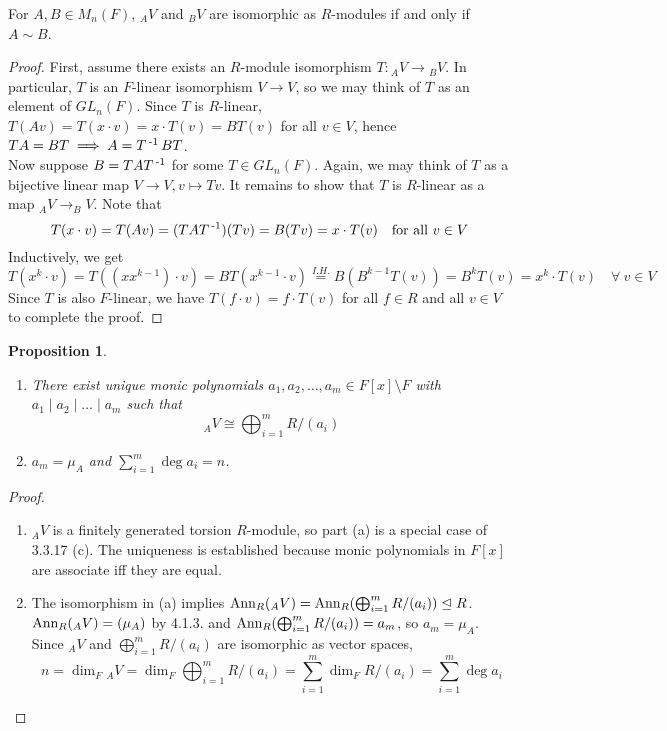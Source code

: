 \documentclass[11pt]{book}
\newcounter{counter}
\newtheorem{proposition}[counter]{Proposition}   \newtheorem{problem}[counter]{Problem}   \newtheorem*{proposition*}{Proposition}   \newtheorem*{lemma*}{Lemma}
\theoremstyle{definition}   \newtheorem{defn}[counter]{Definition} %
\newcommand{\bs}{\setminus}   \newcommand{\A}{\mathcal{A}}   \newcommand{\sy}{\textnormal{Syl}}   \newcommand{\size}[1]{\left| #1 \right|}
\newcommand{\nsg}{\mathrel{\unlhd}}   \newcommand{\ind}{\parindent24pt}   \newcommand{\vn}{\varnothing}    \newcommand{\lar}{\longrightarrow}
\newcommand{\ann}[2]{\textnormal{Ann}_{#1}(#2)}   \newcommand{\rk}{\textnormal{rk}}
\DeclareMathOperator{\ra}{\rightarrow}   \DeclareMathOperator{\Poly}{\mathbf{P}}   \DeclareMathOperator{\spn}{\textnormal{span}}   \DeclareMathOperator{\aut}{\textnormal{Aut}}
\newcommand{\vs}{\vspace{8pt}}
\numberwithin{counter}{chapter}
\begin{document}
\vs

\begin{lemma}
For $A,B \in M_n(F)$, $_AV$ and $_BV$ are isomorphic as $R$-modules if and only if $A \sim B$.
\end{lemma}

\begin{proof}
First, assume there exists an $R$-module isomorphism $T : {_AV} \ra {_BV}$. In particular, $T$ is an $F$-linear isomorphism $V \ra V$, so we may think of $T$ as an element of $GL_n(F)$. Since $T$ is $R$-linear, \\ $T(Av) = T(x \cdot v) = x \cdot T(v) = B T(v)$ for all $v \in V$, hence $TA = BT \implies A = T\operatorname{^{-1}} BT$. \\

Now suppose $B = TAT\operatorname{^{-1}}$ for some $T \in GL_n(F)$. Again, we may think of $T$ as a bijective linear map $V \ra V, v \mapsto Tv$. It remains to show that $T$ is $R$-linear as a map $_AV \ra _BV$. Note that
	\[T(x \cdot v) = T(Av) = (TAT\operatorname{^{-1}})(Tv) = B(Tv) = x \cdot T(v) \quad \textnormal{for all } v \in V \]
Inductively, we get
	\[T(x^k \cdot v) = T((x x^{k-1}) \cdot v) = B T(x^{k-1} \cdot v) \overset{I. H.}{=} B(B^{k-1} T(v)) = B^k T(v) = x^{k} \cdot T(v) \quad \forall \ v \in V \]
Since $T$ is also $F$-linear, we have $T(f \cdot v) = f \cdot T(v)$ for all $f \in R$ and all $v \in V$ to complete the proof.
\end{proof}

\newpage

\begin{proposition}\ 
\begin{enumerate}
\item[(a)] There exist unique monic polynomials $a_1,a_2,\dots,a_m \in F[x]\bs F$ with $a_1 \mid a_2 \mid \dots \mid a_m$ such that 
	\[_AV \cong \bigoplus_{i=1}^m R/(a_i) \]
\item[(b)] $a_m = \mu_A$ and $\sum_{i=1}^m \deg a_i = n$.
\end{enumerate}
\end{proposition}

\begin{proof}\ 
\begin{enumerate}
\item[(a)] $_AV$ is a finitely generated torsion $R$-module, so part (a) is a special case of 3.3.17 (c). The uniqueness is established because monic polynomials in $F[x]$ are associate iff they are equal.
\item[(b)] The isomorphism in (a) implies $\ann{R}{_AV} = \ann{R}{\bigoplus_{i=1}^m R/(a_i)} \nsg R$. $\ann{R}{_AV} = (\mu_A)$ by 4.1.3. and $\ann{R}{\bigoplus_{i=1}^m R/(a_i)} = a_m$, so $a_m = \mu_A$. Since $_AV$ and $\bigoplus_{i=1}^m R/(a_i)$ are isomorphic as vector spaces,
	\[n = \dim_F {_AV} = \dim_F \bigoplus_{i=1}^m R/(a_i) = \sum_{i=1}^m \dim_F R/(a_i) = \sum_{i=1}^m \deg a_i \]
\end{enumerate}
\end{proof}
\end{document}
